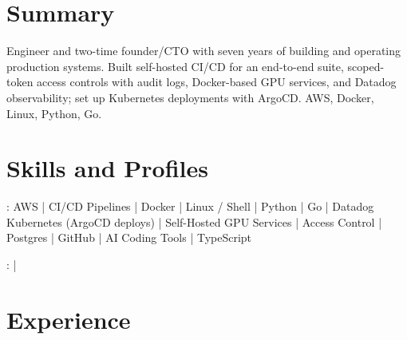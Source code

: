 \documentclass[print]{jack-resume}
\begin{document}
\pagecolor{darkmodeBackground}


\begin{minipage}[t][1cm][t]{.03\textwidth}
    \hfill
\end{minipage}

\section{Summary}
Engineer and two-time founder/CTO with seven years of building and operating production systems. Built self-hosted CI/CD for an end-to-end suite, scoped-token access controls with audit logs, Docker-based GPU services, and Datadog observability; set up Kubernetes deployments with ArgoCD. AWS, Docker, Linux, Python, Go.
\sectionsep

\section{Skills and Profiles}
:
AWS \hfill | \hfill
CI/CD Pipelines \hfill | \hfill
Docker \hfill | \hfill
Linux / Shell \hfill | \hfill
Python \hfill | \hfill
Go \hfill | \hfill
Datadog \\
\hspace{1.0cm} Kubernetes (ArgoCD deploys) \hfill | \hfill
Self-Hosted GPU Services \hfill | \hfill
Access Control \hfill | \hfill
Postgres \hfill | \hfill
GitHub \hfill | \hfill
AI Coding Tools \hfill | \hfill
TypeScript \\

\raggedright{
    :
      \href{https://www.linkedin.com/in/jack-sturtevant/}{ \ExternalLink} |
     \href{https://github.com/jacksturt}{ \ExternalLink}}

\section{Experience}
\end{document}
